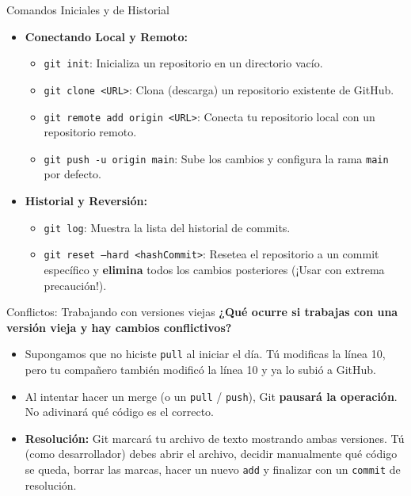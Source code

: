 \documentclass[11pt, aspectratio=169]{beamer}
\begin{document}
\begin{frame}{Comandos Iniciales y de Historial}
    \begin{itemize}
        \item \textbf{Conectando Local y Remoto:}
        \begin{itemize}
            \item \texttt{git init}: Inicializa un repositorio en un directorio vacío.
            \item \texttt{git clone <URL>}: Clona (descarga) un repositorio existente de GitHub.
            \item \texttt{git remote add origin <URL>}: Conecta tu repositorio local con un repositorio remoto.
            \item \texttt{git push -u origin main}: Sube los cambios y configura la rama \texttt{main} por defecto.
        \end{itemize}
        \item \textbf{Historial y Reversión:}
        \begin{itemize}
            \item \texttt{git log}: Muestra la lista del historial de commits.
            \item \texttt{git reset --hard <hashCommit>}: Resetea el repositorio a un commit específico y \textbf{elimina} todos los cambios posteriores (¡Usar con extrema precaución!).
        \end{itemize}
    \end{itemize}
\end{frame}

\begin{frame}{Conflictos: Trabajando con versiones viejas}
    \textbf{¿Qué ocurre si trabajas con una versión vieja y hay cambios conflictivos?}
    \vspace{0.2cm}
    \begin{itemize}
        \item Supongamos que no hiciste \texttt{pull} al iniciar el día. Tú modificas la línea 10, pero tu compañero también modificó la línea 10 y ya lo subió a GitHub.
        \item Al intentar hacer un merge (o un \texttt{pull} / \texttt{push}), Git \textbf{pausará la operación}. No adivinará qué código es el correcto.
        \item \textbf{Resolución:} Git marcará tu archivo de texto mostrando ambas versiones. Tú (como desarrollador) debes abrir el archivo, decidir manualmente qué código se queda, borrar las marcas, hacer un nuevo \texttt{add} y finalizar con un \texttt{commit} de resolución.
    \end{itemize}
\end{frame}
\end{document}
